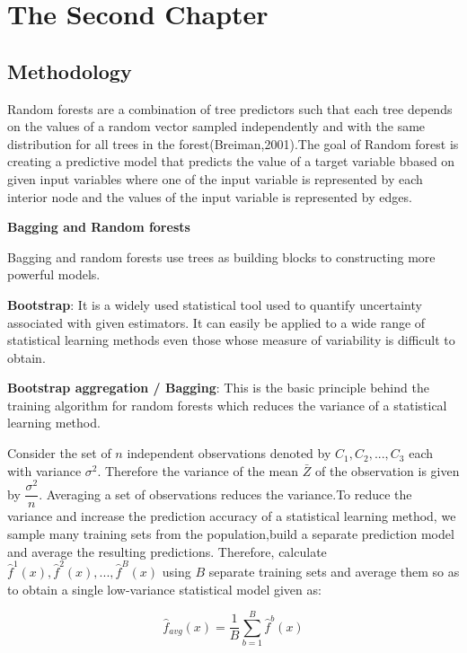 \chapter{The Second Chapter}
\section*{Methodology}
Random forests are a combination of tree predictors such that each tree depends on the values of a random vector sampled independently and with the same distribution for all trees in the forest(Breiman,2001).The goal of Random forest is creating a predictive model that predicts the value of a target variable bbased on given input variables where one of the input variable is represented by each interior node and the values of the input variable is represented by edges.

\begin{center}
\textbf{Bagging and Random forests}
\end{center}
 
Bagging and random forests use trees as building blocks to constructing more powerful models.

\textbf{Bootstrap}: It is a widely used statistical tool used to quantify uncertainty associated with given estimators. It can easily be applied to a wide range of statistical learning methods even those whose measure of variability is difficult to obtain.

\textbf{Bootstrap aggregation / Bagging}: This is the basic principle behind the training algorithm for random forests which reduces the variance of a statistical learning method.

Consider the set of $n$ independent observations denoted by $C_1,C_2,...,C_3$ each with variance $\sigma^2$. Therefore the variance of the mean $\bar{Z}$ of the observation is given by $\dfrac{\sigma^2}{n}$. Averaging a set of observations reduces the variance.To reduce the variance and increase the prediction accuracy of a statistical learning method, we sample many training sets from the population,build a separate prediction model and average the resulting predictions. Therefore, calculate $\hat{f}^{1}(x),\hat{f}^{2}(x),...,\hat{f}^{B}(x)$ using $B$ separate training sets and average them so as to obtain a single low-variance statistical model given as:

\begin{equation}
\hat{f}_{avg}(x)=\dfrac{1}{B} \sum_{b=1}^{B} \hat{f}^{b}(x)
\end{equation}

